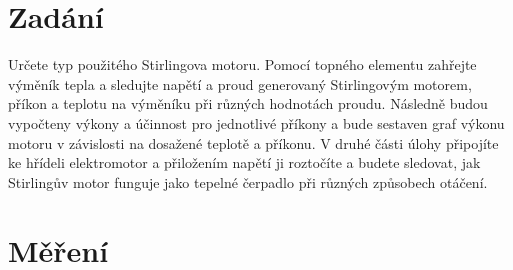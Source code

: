 \documentclass{article}
\begin{document}


\begin{minipage}[t]{\textwidth}
  \section*{Zadání}
  Určete typ použitého Stirlingova motoru. 
  Pomocí topného elementu zahřejte výměník tepla a sledujte napětí a proud generovaný Stirlingovým motorem, příkon a teplotu na výměníku při různých hodnotách proudu. 
  Následně budou vypočteny výkony a účinnost pro jednotlivé příkony a bude sestaven graf výkonu motoru v závislosti na dosažené teplotě a příkonu.
  V druhé části úlohy připojíte ke hřídeli elektromotor a přiložením napětí ji roztočíte a budete sledovat, jak Stirlingův motor funguje jako tepelné čerpadlo při různých způsobech otáčení.
\end{minipage}


\section{Měření}
\end{document}
